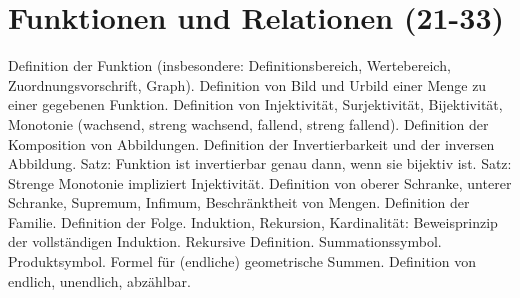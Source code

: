 \section{Funktionen und Relationen (21-33)}
  
Definition der Funktion (insbesondere: Definitionsbereich, Wertebereich, Zuordnungsvorschrift, Graph). Definition von Bild und Urbild einer Menge zu einer gegebenen Funktion. Definition von Injektivität, Surjektivität, Bijektivität, Monotonie (wachsend, streng wachsend, fallend, streng fallend). Definition der Komposition von Abbildungen. Definition der Invertierbarkeit und der inversen Abbildung. Satz: Funktion ist invertierbar genau dann, wenn sie bijektiv ist. Satz: Strenge Monotonie impliziert Injektivität. Definition von oberer Schranke, unterer Schranke, Supremum, Infimum, Beschränktheit von Mengen. Definition der Familie. Definition der Folge. 
Induktion, Rekursion, Kardinalität: 
Beweisprinzip der vollständigen Induktion. Rekursive Definition. Summationssymbol. Produktsymbol. Formel für (endliche) geometrische Summen. Definition von endlich, unendlich, abzählbar. 